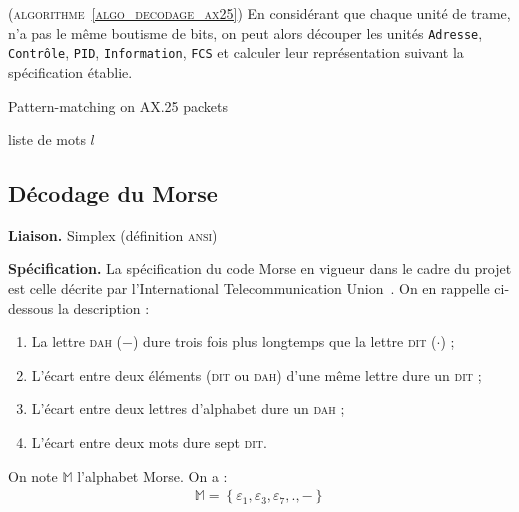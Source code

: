 \documentclass[twocolumn,pre,floats,aps,amsmath,amssymb]{revtex4}
\newenvironment{implementation}[1][Impl\'ementation.]{\begin{trivlist}
\item[\hskip \labelsep {\bfseries #1}]}{\end{trivlist}}
\newenvironment{definition}[1][D\'efinition.]{\begin{trivlist}
\item[\hskip \labelsep {\bfseries #1}]}{\end{trivlist}}
\begin{document}
\begin{implementation}
  (\textsc{algorithme~\ref{algo_decodage_ax25}})
  { \color{rltred}{\Radioactivity} }
  En consid\'erant que chaque unit\'e de trame, n'a pas le m\^eme boutisme de bits, on peut alors d\'ecouper les unit\'es \texttt{Adresse}, \texttt{Contr\^ole}, \texttt{PID}, \texttt{Information}, \texttt{FCS} et calculer leur repr\'esentation suivant la sp\'ecification \'etablie.
\end{implementation}

\begin{algorithm}[h]
\caption{Pattern-matching on AX.25 packets}
\label{algo_decodage_ax25}
\begin{algorithmic}[1]
  \REQUIRE liste de mots $l$
\end{algorithmic}
\end{algorithm}


\subsection{D\'ecodage du Morse}

\textbf{Liaison.} Simplex (d\'efinition \textsc{ansi})

\vspace{0.3cm}

\textbf{Sp\'ecification.}
La sp\'ecification du code Morse en vigueur dans le cadre du projet est celle d\'ecrite par l'International Telecommunication Union~\cite{ITU_morse}. On en rappelle ci-dessous la description :

\begin{enumerate}
  \item{La lettre \textsc{dah} ($-$) dure trois fois plus longtemps que la lettre \textsc{dit} ($\cdot$) ;}
  \item{L'\'ecart entre deux \'el\'ements (\textsc{dit} ou \textsc{dah}) d'une m\^eme lettre dure un \textsc{dit} ;}
  \item{L'\'ecart entre deux lettres d'alphabet dure un \textsc{dah} ;}
  \item{L'\'ecart entre deux mots dure sept \textsc{dit}.}
\end{enumerate}

\begin{definition}
  On note $\mathbb{M}$ l'alphabet Morse. On a :
  \begin{eqnarray*}
    \mathbb{M} = \left \{ \varepsilon_1, \varepsilon_3, \varepsilon_7, ., - \right \}
  \end{eqnarray*}
\end{definition}
\end{document}
